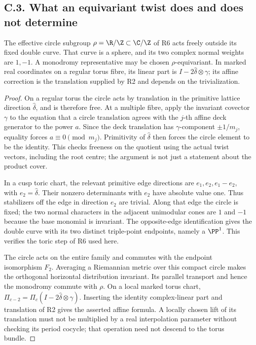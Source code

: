 

\subsection{C.3. What an equivariant twist does and does not determine}

\begin{proposition}
The effective circle subgroup $\rho=\R/\Z\subset\C/\Z$ of R6
acts freely outside its fixed double curve. That curve is a sphere,
and its two complex normal weights are $1,-1$. A monodromy
representative may be chosen $\rho$-equivariant. In marked real
coordinates on a regular torus fibre, its linear part is
$I-2\widehat\delta\otimes\gamma$; its affine correction is the
translation supplied by R2 and depends on the trivialization.
\end{proposition}

\begin{proof}
On a regular torus the circle acts by translation in the primitive
lattice direction $\widehat\delta$, and is therefore free.
At a multiple fibre, apply the invariant covector $\gamma$ to the
equation that a circle translation agrees with the $j$-th affine
deck generator to the power $a$. Since the deck translation has
$\gamma$-component $\pm1/m_j$, equality forces
$a\equiv0\pmod{m_j}$. Primitivity of $\widehat\delta$ then
forces the circle element to be the identity. This checks freeness
on the quotient using the actual twist vectors, including the root
centre; the argument is not just a statement about the product cover.

In a cusp toric chart, the relevant primitive edge directions are
$e_1,e_2,e_1-e_2$, with $e_2=\widehat\delta$.
Their nonzero determinants with $e_2$ have absolute value one.
Thus stabilizers off the edge in direction $e_2$ are trivial. Along
that edge the circle is fixed; the two normal characters in the
adjacent unimodular cones are $1$ and $-1$ because the base monomial
is invariant. The opposite-edge identification gives the double
curve with its two distinct triple-point endpoints, namely a
$\PP^1$. This verifies the toric step of R6 used here.

The circle acts on the entire family and commutes with the endpoint
isomorphism $F_2$. Averaging a Riemannian metric over this compact
circle makes the orthogonal horizontal distribution invariant.
Its parallel transport and hence the monodromy commute with $\rho$.
On a local marked torus chart,
$\Pi_{c-2}=\Pi_c(I-2\widehat\delta\otimes\gamma)$.
Inserting the identity complex-linear part and translation of R2
gives the asserted affine formula. A locally chosen lift of its
translation must not be multiplied by a real interpolation parameter
without checking its period cocycle; that operation need not descend
to the torus bundle.
\end{proof}

